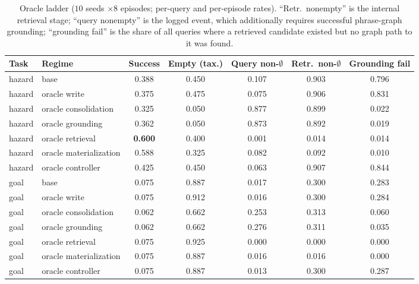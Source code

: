 \documentclass{article}
\begin{document}
\begin{table}[h]
\centering
\caption{Oracle ladder ($10$ seeds $\times 8$ episodes; per-query and
per-episode rates). ``Retr.\ nonempty'' is the internal retrieval
stage; ``query nonempty'' is the logged event, which additionally
requires successful phrase-graph grounding; ``grounding fail'' is the
share of all queries where a retrieved candidate existed but no graph
path to it was found.}
\label{p1:tab:oracle-ladder}
\small
\setlength{\tabcolsep}{4pt}
\begin{tabular}{llccccc}
\toprule
Task & Regime & Success & Empty (tax.) & Query non-$\emptyset$ & Retr.\ non-$\emptyset$ & Grounding fail \\
\midrule
hazard & base                & 0.388 & 0.450 & 0.107 & 0.903 & 0.796 \\
hazard & oracle write        & 0.375 & 0.475 & 0.075 & 0.906 & 0.831 \\
hazard & oracle consolidation& 0.325 & 0.050 & 0.877 & 0.899 & 0.022 \\
hazard & oracle grounding    & 0.362 & 0.050 & 0.873 & 0.892 & 0.019 \\
hazard & oracle retrieval    & \textbf{0.600} & 0.400 & 0.001 & 0.014 & 0.014 \\
hazard & oracle materialization & 0.588 & 0.325 & 0.082 & 0.092 & 0.010 \\
hazard & oracle controller   & 0.425 & 0.450 & 0.063 & 0.907 & 0.844 \\
\midrule
goal   & base                & 0.075 & 0.887 & 0.017 & 0.300 & 0.283 \\
goal   & oracle write        & 0.075 & 0.912 & 0.016 & 0.300 & 0.284 \\
goal   & oracle consolidation& 0.062 & 0.662 & 0.253 & 0.313 & 0.060 \\
goal   & oracle grounding    & 0.062 & 0.662 & 0.276 & 0.311 & 0.035 \\
goal   & oracle retrieval    & 0.075 & 0.925 & 0.000 & 0.000 & 0.000 \\
goal   & oracle materialization & 0.075 & 0.887 & 0.016 & 0.016 & 0.000 \\
goal   & oracle controller   & 0.075 & 0.887 & 0.013 & 0.300 & 0.287 \\
\bottomrule
\end{tabular}
\end{table}
\end{document}
